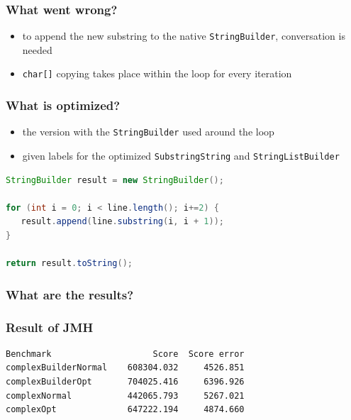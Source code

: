 \documentclass{beamer}
\begin{document}
\begin{frame}
   \frametitle{What went wrong?}
   \begin{itemize}
      \item to append the new substring to the native \texttt{StringBuilder}, conversation is needed
      \item \texttt{char[]} copying takes place within the loop for every iteration
   \end{itemize}
\end{frame}

\begin{frame}[fragile]
   \frametitle{What is optimized?}
   
   \begin{itemize}
      \item the version with the \texttt{StringBuilder} used around the loop
      \item given labels for the optimized \texttt{SubstringString} and \texttt{StringListBuilder}
   \end{itemize}

   \begin{lstlisting}[language=Java]
StringBuilder result = new StringBuilder();

for (int i = 0; i < line.length(); i+=2) {
   result.append(line.substring(i, i + 1));
}

return result.toString();
   \end{lstlisting}   

\end{frame}

\begin{frame}
  \frametitle{What are the results?}
  \begin{bchart}[step=500,max=1500]
      \smallskip
      \smallskip
  \end{bchart}
\end{frame}

\begin{frame}[fragile]
   \frametitle{Result of JMH}
   
\begin{lstlisting}[breaklines=false]
Benchmark                    Score  Score error
complexBuilderNormal    608304.032     4526.851
complexBuilderOpt       704025.416     6396.926
complexNormal           442065.793     5267.021
complexOpt              647222.194     4874.660
\end{lstlisting}

\end{frame}
\end{document}
